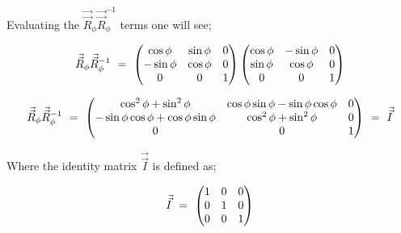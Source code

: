 \documentclass{ece}
\begin{document}
Evaluating the \begin{math} \vec{\vec{R}}_{\phi} \vec{\vec{R}}_{\phi}^{-1} \end{math} terms one will see;

\begin{equation}
\vec{\vec{R}}_{\phi} \vec{\vec{R}}_{\phi}^{-1} \hspace{0.125cm} = \hspace{0.125cm} 
\begin{pmatrix}
\cos{\phi} & \sin{\phi} & 0 \\
-\sin{\phi} & \cos{\phi} & 0 \\
0 & 0 & 1 
\end{pmatrix}
\begin{pmatrix}
\cos{\phi} & -\sin{\phi} & 0 \\
\sin{\phi} & \cos{\phi} & 0 \\
0 & 0 & 1 
\end{pmatrix}
\end{equation}

\begin{equation}
\vec{\vec{R}}_{\phi} \vec{\vec{R}}_{\phi}^{-1} 
\hspace{0.125cm} = \hspace{0.125cm} 
\begin{pmatrix}
\cos^{2}{\phi} + \sin^{2}{\phi} & \cos{\phi} \sin{\phi} - \sin{\phi} \cos{\phi} & 0 \\
- \sin{\phi} \cos{\phi} + \cos{\phi} \sin{\phi} & \cos^{2}{\phi} + \sin^{2}{\phi} & 0 \\
0 & 0 & 1 
\end{pmatrix}
\hspace{0.125cm} = \hspace{0.125cm} \vec{\vec{I}}
\end{equation}

Where the identity matrix \begin{math} \vec{\vec{I}} \end{math} is defined as;

\begin{equation}
 \vec{\vec{I}}
\hspace{0.125cm} = \hspace{0.125cm} 
\begin{pmatrix}
1 & 0 & 0 \\
0 & 1 & 0 \\
0 & 0 & 1 
\end{pmatrix}
\end{equation}
\end{document}
